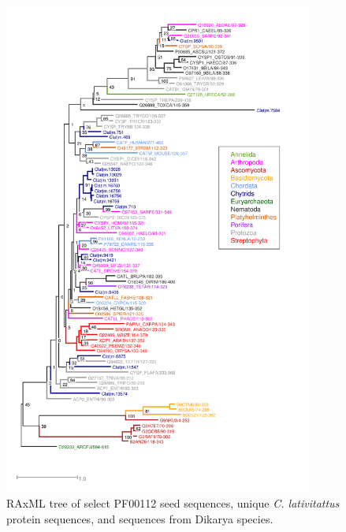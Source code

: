 \begin{figure}[htbp]
  \includegraphics[width=4in]{./Chapter_Coelomomyces/img/PF00112_tree.png}
  \caption[PF00112 RAxML tree]{RAxML tree of select PF00112 seed sequences, unique \textit{C. lativitattus} protein sequences, and sequences from Dikarya species.}
  \label{fig:ChClat_PF00112}
\end{figure}

